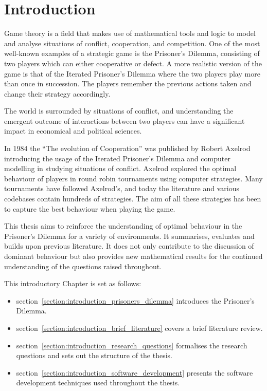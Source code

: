 \chapter{Introduction}\label{chapter:introduction}

Game theory is a field that makes use of mathematical tools and logic to model
and analyse situations of conflict, cooperation, and competition. One of the
most well-known examples of a strategic game is the Prisoner's Dilemma,
consisting of two players which can either cooperative or defect. A more
realistic version of the game is that of the Iterated Prisoner's Dilemma where
the two players play more than once in succession. The players remember the
previous actions taken and change their strategy accordingly.

The world is surrounded by situations of conflict, and understanding the
emergent outcome of interactions between two players can have a significant impact in
economical and political sciences.

In 1984 the ``The evolution of Cooperation'' was published by Robert Axelrod
introducing the usage of the Iterated Prisoner's Dilemma and computer modelling
in studying situations of conflict. Axelrod explored the optimal behaviour of
players in round robin tournaments using computer strategies. Many tournaments
have followed Axelrod's, and today the literature and various codebases
contain hundreds of strategies. The aim of all these strategies has been to capture
the best behaviour when playing the game.

This thesis aims to reinforce the understanding of optimal behaviour in the
Prisoner's Dilemma for a variety of environments. It summarises,
evaluates and builds upon previous literature. It does not only contribute to
the discussion of dominant behaviour but also provides new mathematical results
for the continued understanding of the questions raised throughout.

This introductory Chapter is set as follows:

\begin{itemize}
    \item section~\ref{section:introduction_prisoners_dilemma} introduces
    the Prisoner's Dilemma.
    \item section~\ref{section:introduction_brief_literature} covers a brief
    literature review.
    \item section~\ref{section:introduction_research_questions} formalises the research
    questions and sets out the structure of the thesis.
    \item section~\ref{section:introduction_software_development} presents the
    software development techniques used throughout the thesis.
\end{itemize}

